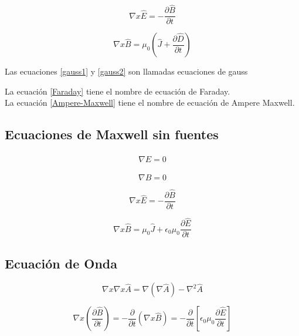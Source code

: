 \documentclass[]{article}
\begin{document}
\begin{equation}
\nabla x \hat{E}=-\frac{\partial \hat{B}}{\partial t}
\label{Faraday}
\end{equation}

\begin{equation}
\nabla x \hat{B}=\mu_0 (\hat{J}+\frac{\partial \hat{D}}{\partial t})
\label{Ampere-Maxwell}
\end{equation}

Las ecuaciones \ref{gauss1} y \ref{gauss2} son llamadas ecuaciones de gauss

La ecuación \ref{Faraday} tiene el nombre de ecuación de Faraday.\\


La ecuación \ref{Ampere-Maxwell} tiene el nombre de ecuación de Ampere Maxwell.\\


\subsection{Ecuaciones de Maxwell sin fuentes}

\begin{equation}
\nabla \hat{E}=0
\end{equation}

\begin{equation}
\nabla \hat{B}=0
\end{equation}

\begin{equation}
\nabla x \hat{E}=-\frac{\partial \hat{B}}{\partial t}
\end{equation}

\begin{equation}
\nabla x \hat{B}=\mu_0\hat{J}+\epsilon_0\mu_0\frac{\partial \hat{E}}{\partial{t}}
\end{equation}

\subsection{Ecuación de Onda}

\begin{equation}
\nabla x \nabla x \hat{A}=\nabla(\nabla \hat{A})-\nabla^2\hat{A}
\end{equation}

\begin{equation}
\nabla x (\frac{\partial \hat{B}}{\partial t})=-\frac{\partial}{\partial t}(\nabla x \hat{B})=-\frac{\partial}{\partial t}[\epsilon_0\mu_0\frac{\partial \hat{E}}{\partial t}]
\end{equation}
\end{document}
